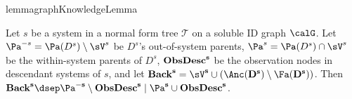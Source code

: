 \newcommand{\ObsDesc}{\bf{{ObsDesc}}}
\newcommand{\Back}{\bf{Back}}

\newcommand{\graphknowledgelemmastatement}{
Let $s$ be a system in a normal form tree $\mathcal{T}$ on a soluble ID graph $\calG$.
Let $\Pa^{-s}=\Pa(D^s) \setminus \sV^s$ be $D^s$'s out-of-system parents, $\Pa^{s}= {\Pa(D^s)\cap \sV^s}$ 
be the within-system parents of $D^s$,
$\ObsDesc^s$ be the 
observation nodes in descendant systems of $s$, and let $\Back^s=\sV^s \cup (\Anc(D^s) \setminus \Fa(D^s))$. %
Then \mbox{$\Back^s \dsep \Pa^{-s}\setminus \ObsDesc^s \mid \Pa^s\cup \ObsDesc^s$}.
}



\begin{restatable}[\GraphKnowledgeLemmaName]{lemma}{graphKnowledgeLemma} \label{le:2v2-graph-knowledge-lemma}
\graphknowledgelemmastatement
\end{restatable}



